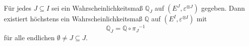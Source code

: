Für jedes $J \subseteq I$ sei ein Wahrscheinlichkeitsmaß $\mathbb{Q}_{J}$ auf  $(E^{J},\varepsilon^{ \otimes J})$ gegeben. Dann existiert höchstens ein Wahrscheinlichkeitsmaß $\mathbb{Q}$ auf $(E^{I},\varepsilon^{ \otimes I})$ mit
\begin{equation*}
{\mathbb{Q}}_{J} = \mathbb{Q} \circ {\pi_{J}}^{-1} 
\end{equation*}
für alle endlichen $\emptyset \neq J \subseteq J$.